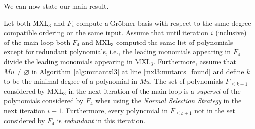 We can now state our main result.
\begin{theorem}
\label{theorem:main}
Let both MXL$_3$ and $F_4$ compute a Gr\"obner basis with respect to the same degree compatible ordering on the same input. Assume that until iteration $i$ (inclusive) of the main loop both $F_4$ and MXL$_3$ computed the same list of polynomials except for redundant polynomials, i.e., the leading monomials appearing in $F_4$ divide the leading monomials appearing in MXL$_3$. Furthermore, assume that $Mu \neq \varnothing$ in Algorithm~\ref{alg:mutantxl3} at line \ref{mxl3:mutants_found} and define $k$ to be the minimal degree of a polynomial in $Mu$. The set of polynomials $F_{\leq k+1}$ considered by MXL$_3$ in the next iteration of the main loop is a {\it superset} of the polynomials considered by $F_4$ when using the \emph{Normal Selection Strategy} in the next iteration $i+1$. Furthermore, every polynomial in $F_{\leq k+1}$ not in the set considered by $F_4$ is {\it redundant} in this iteration.
\end{theorem}

